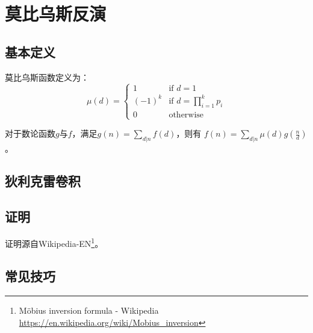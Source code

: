 \section{莫比乌斯反演}
\subsection{基本定义}
莫比乌斯函数定义为：
\begin{displaymath}
	\mu(d)=
	\left\{
	\begin{array}{ll}
		1      & \textrm{if $d=1$}                  \\
		(-1)^k & \textrm{if $d=\prod_{i=1}^k{p_i}$} \\
		0      & \textrm{otherwise}
	\end{array}
	\right.
\end{displaymath}
\begin{theorem}
    对于数论函数$g$与$f$，满足$g(n)=\sum_{d|n}f(d)$，则有
    $f(n)=\sum_{d|n}\mu(d)g(\frac{n}{d})$。
\end{theorem}
\subsection{狄利克雷卷积}

\subsection{证明}

证明源自Wikipedia-EN\footnote{Möbius inversion formula - Wikipedia\\
\url{https://en.wikipedia.org/wiki/Mobius_inversion}}。
\subsection{常见技巧}
